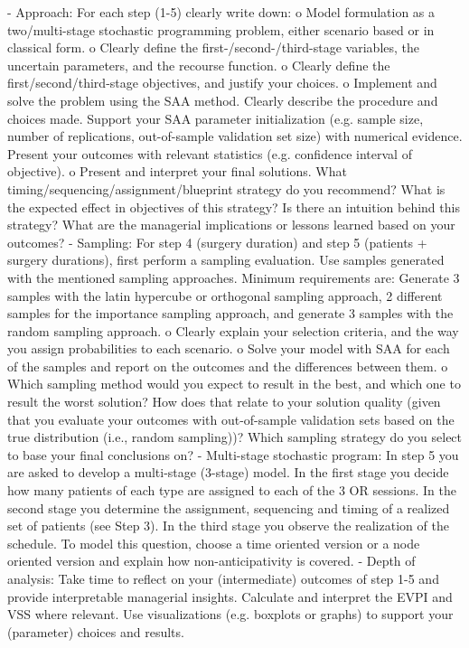 - Approach: For each step (1-5) clearly write down:
o Model formulation as a two/multi-stage stochastic programming problem, either scenario based or in classical form.
o Clearly define the first-/second-/third-stage variables, the uncertain parameters, and the recourse function.
o Clearly define the first/second/third-stage objectives, and justify your choices.
o Implement and solve the problem using the SAA method. Clearly describe the procedure and choices made. Support your SAA parameter initialization (e.g. sample size, number of replications, out-of-sample validation set size) with numerical evidence. Present your outcomes with relevant statistics (e.g. confidence interval of objective).
o Present and interpret your final solutions. What timing/sequencing/assignment/blueprint strategy do you recommend? What is the expected effect in objectives of this strategy? Is there an intuition behind this strategy? What are the managerial implications or lessons learned based on your outcomes?
- Sampling: For step 4 (surgery duration) and step 5 (patients + surgery durations), first perform a sampling evaluation. Use samples generated with the mentioned sampling approaches. Minimum requirements are: Generate 3 samples with the latin hypercube or orthogonal sampling approach, 2 different samples for the
importance sampling approach, and generate 3 samples with the random sampling approach.
o Clearly explain your selection criteria, and the way you assign probabilities to each scenario.
o Solve your model with SAA for each of the samples and report on the outcomes and the differences between them.
o Which sampling method would you expect to result in the best, and which one to result the worst solution? How does that relate to your solution quality (given that you evaluate your outcomes with out-of-sample validation sets based on the true distribution (i.e., random sampling))? Which sampling strategy do you select to base your final conclusions on?
- Multi-stage stochastic program: In step 5 you are asked to develop a multi-stage (3-stage) model. In the first stage you decide how many patients of each type are assigned to each of the 3 OR sessions. In the second stage you determine the assignment, sequencing and timing of a realized set of patients (see Step 3). In the third stage you observe the realization of the schedule. To model this question, choose a time oriented version or a node oriented version and explain how non-anticipativity is covered.
- Depth of analysis: Take time to reflect on your (intermediate) outcomes of step 1-5 and provide interpretable managerial insights. Calculate and interpret the EVPI and VSS where relevant. Use visualizations (e.g. boxplots or graphs) to support your (parameter) choices and results.
